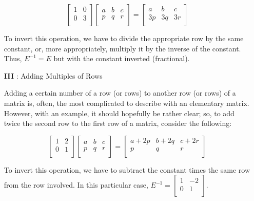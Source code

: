 \documentclass[12pt]{article}
\begin{document}
\begin{itemize}
    \begin{equation}
        \begin{bmatrix}
            1 & 0 \\
            0 & 3\\
        \end{bmatrix} \begin{bmatrix}
            a & b & c\\
            p & q & r\\
        \end{bmatrix} =  \begin{bmatrix}
            a & b & c\\
            3p & 3q & 3r\\
        \end{bmatrix}
    \end{equation}

    To invert this operation, we have to divide the appropriate row by the same constant, or, more appropriately, multiply it by the inverse of the constant. Thus, $E^{-1} = E$ but with the constant inverted (fractional).

    \item[\textbf{III}]: Adding Multiples of Rows
    
    Adding a certain number of a row (or rows) to another row (or rows) of a matrix is, often, the most complicated to describe with an elementary matrix. However, with an example, it should hopefully be rather clear; so, to add twice the second row to the first row of a matrix, consider the following:

    \begin{equation}
        \begin{bmatrix}
            1 & 2 \\
            0 & 1\\
        \end{bmatrix} \begin{bmatrix}
            a & b & c\\
            p & q & r\\
        \end{bmatrix} =  \begin{bmatrix}
            a + 2p & b + 2q & c + 2r\\
            p & q & r\\
        \end{bmatrix}
    \end{equation}

    To invert this operation, we have to subtract the constant times the same row from the row involved. In this particular case, $E^{-1} = \begin{bmatrix}
        1 & -2\\
        0 & 1\\
    \end{bmatrix}$.
\end{itemize}
\end{document}
